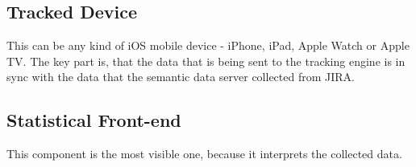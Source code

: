 \subsection{Tracked Device}

This can be any kind of iOS mobile device - iPhone, iPad, Apple Watch or Apple TV. The key part is, that the data that is being sent to the tracking engine is in sync with the data that the semantic data server collected from JIRA.


\subsection{Statistical Front-end}

This component is the most visible one, because it interprets the collected data.